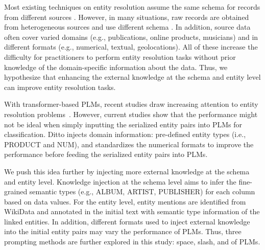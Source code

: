 Most existing techniques on entity resolution assume the same schema for records from different sources \cite{elmagarmid_duplicate_2007}. However, in many situations, raw records are obtained from heterogeneous sources and use different schema \cite{enriquez_entity_2017, arabnia_when_2021}. In addition, source data often cover varied domains (e.g., publications, online products, musicians) and in different formats (e.g., numerical, textual, geolocations). 
All of these increase the difficulty for practitioners to perform entity resolution tasks without prior knowledge of the domain-specific information about the data.
Thus, we hypothesize that enhancing the external knowledge at the schema and entity level can improve entity resolution tasks.  

With transformer-based PLMs, recent studies draw increasing attention to entity resolution problems~\cite{li_deep_2020, trabelsi_dame_2022}. However, current studies show that the performance might not be ideal when simply inputting the serialized entity pairs into PLMs for classification. Ditto \cite{li_deep_2020} injects domain information: pre-defined entity types (i.e., PRODUCT and NUM), and standardizes the numerical formats to improve the performance before feeding the serialized entity pairs into PLMs.

We push this idea further by injecting more external knowledge at the schema and entity level. Knowledge injection at the schema level aims to infer the fine-grained semantic types (e.g., ALBUM, ARTIST, PUBLISHER) for each column based on data values. 
For the entity level, entity mentions are identified from WikiData and annotated in the initial text with semantic type information of the linked entities. In addition, different formats used to inject external knowledge into the initial entity pairs may vary the performance of PLMs. Thus, three prompting methods are further explored in this study: space, slash, and  of PLMs.

